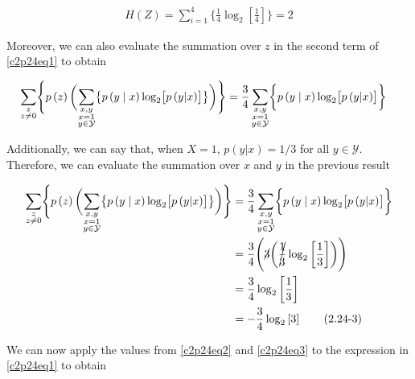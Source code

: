 \documentclass[ClusteringConnectionsMAIN.tex]{subfiles}
\begin{document}
\begin{align} \label{c2p24eq2}
H \left( Z \right) = \sum_{i=1}^4 \biggl\{ \frac{1}{4} \log_2 \left[ \frac{1}{4} \right] \biggr\} = 2  \tag{2.24-2}
\end{align}

Moreover, we can also evaluate the summation over $z$ in the second term of \ref{c2p24eq1} to obtain

\begin{align}
\sum_{\substack{z \\ z \neq 0}} \Biggl\{ p \left( z \right) \biggl( \sum_{\substack{x, y \\ x = 1 \\ y \in \mathcal{Y}}} \bigl\{ p \left( y \mid x \right) \log_2 \bigl[ p \left( y | x \right) \bigr] \bigr\} \biggr) \Biggr\} &= \frac{3}{4} \sum_{\substack{x, y \\ x = 1 \\ y \in \mathcal{Y}}} \biggl\{ p \left( y \mid x \right) \log_2 \bigl[ p \left( y | x \right) \bigr] \biggr\} \notag
\end{align}

Additionally, we can say that, when $X = 1$, $p \left( y | x \right) = 1/3$ for all $y \in \mathcal{Y}$.  Therefore, we can evaluate the summation over $x$ and $y$ in the previous result

\begin{align} \label{c2p24eq3}
\sum_{\substack{z \\ z \neq 0}} \Biggl\{ p \left( z \right) \biggl( \sum_{\substack{x, y \\ x = 1 \\ y \in \mathcal{Y}}} \bigl\{ p \left( y \mid x \right) \log_2 \bigl[ p \left( y | x \right) \bigr] \bigr\} \biggr) \Biggr\} &= \frac{3}{4} \sum_{\substack{x, y \\ x = 1 \\ y \in \mathcal{Y}}} \biggl\{ p \left( y \mid x \right) \log_2 \bigl[ p \left( y | x \right) \bigr] \biggr\} \notag \\
&= \frac{3}{4} \Biggl( \cancel{3} \biggl( \cancel{\frac{1}{3}} \log_2 \left[ \frac{1}{3} \right] \biggr) \Biggr)  \notag \\
&= \frac{3}{4} \log_2 \left[ \frac{1}{3} \right]  \notag \\
&= - \frac{3}{4} \log_2 \left[ 3 \right]  \tag{2.24-3}
\end{align}

We can now apply the values from \ref{c2p24eq2} and \ref{c2p24eq3} to the expression in \ref{c2p24eq1} to obtain
\end{document}
